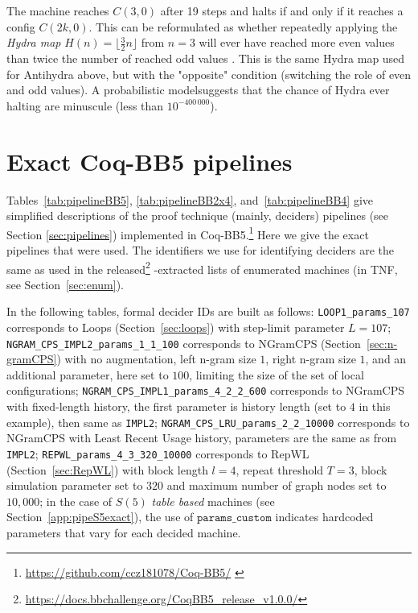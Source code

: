 \documentclass[letterpaper,british,11pt]{article}
\theoremstyle{definition} %
\numberwithin{equation}{section}
\theoremstyle{definition} %
\newcommand{\CoqBB}{Coq-BB5\xspace}
\begin{document}
\begin{itemize}
          The machine reaches $C(3,0)$ after 19 steps and halts if and only if it reaches a config $C(2k,0)$. This can be reformulated as whether repeatedly applying the \textit{Hydra map} $H(n) = \lfloor \frac{3}{2}n\rfloor$ from $n=3$ will ever have reached more even values than twice the number of reached odd values \cite{ligocki2024bb25}. This is the same Hydra map used for Antihydra above, but with the "opposite" condition (switching the role of even and odd values). A probabilistic model suggests that the chance of Hydra ever halting are minuscule (less than $10^{-400\,000}$).

\end{itemize}

\newpage
\section{Exact \CoqBB pipelines}\label{app:pipelines}


Tables~\ref{tab:pipelineBB5}, \ref{tab:pipelineBB2x4}, and~\ref{tab:pipelineBB4} give simplified descriptions of the proof technique (mainly, deciders) pipelines (see Section \ref{sec:pipelines}) implemented in \CoqBB.\footnote{\url{https://github.com/ccz181078/Coq-BB5/} \cite{mxdys_2025_17061968}} Here we give the exact pipelines that were used. The identifiers we use for identifying deciders are the same as used in the released\footnote{\url{https://docs.bbchallenge.org/CoqBB5_release_v1.0.0/}} \Coq-extracted lists of enumerated machines (in TNF, see Section~\ref{sec:enum}).

In the following tables, formal decider IDs are built as follows: \texttt{LOOP1\_params\_107} corresponds to Loops (Section~\ref{sec:loops}) with step-limit parameter $L=107$; \texttt{NGRAM\_CPS\_IMPL2\_params\_1\_1\_100} corresponds to NGramCPS (Section~\ref{sec:n-gramCPS}) with no augmentation, left n-gram size $1$, right n-gram size $1$, and an additional parameter, here set to $100$, limiting the size of the set of local configurations; \texttt{NGRAM\_CPS\_IMPL1\_params\_4\_2\_2\_600} corresponds to NGramCPS with fixed-length history, the first parameter is history length (set to $4$ in this example), then same as \texttt{IMPL2}; \texttt{NGRAM\_CPS\_LRU\_params\_2\_2\_10000} corresponds to NGramCPS with Least Recent Usage history, parameters are the same as from \texttt{IMPL2}; \texttt{REPWL\_params\_4\_3\_320\_10000} corresponds to RepWL (Section~\ref{sec:RepWL}) with block length $l=4$, repeat threshold $T=3$, block simulation parameter set to $320$ and maximum number of graph nodes set to $10{,}000$; in the case of $S(5)$ \textit{table based} machines (see Section~\ref{app:pipeS5exact}), the use of $\texttt{params\_custom}$ indicates hardcoded parameters that vary for each decided machine.
\end{document}
